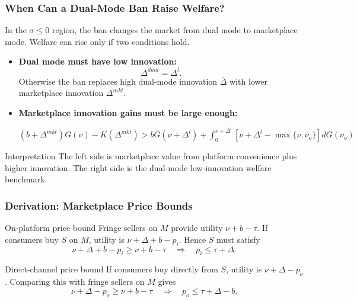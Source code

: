 \begin{frame}
  \frametitle{When Can a Dual-Mode Ban Raise Welfare?}
  \footnotesize
  In the $\sigma\leq0$ region, the ban changes the market from dual mode to
  marketplace mode. Welfare can rise only if two conditions hold.

  \begin{itemize}
    \item \textbf{Dual mode must have low innovation:}
      \[
        \Delta^{dual}=\Delta^l.
      \]
      Otherwise the ban replaces high dual-mode innovation
      $\bar{\Delta}$ with lower marketplace innovation $\Delta^{mkt}$.

    \item \textbf{Marketplace innovation gains must be large enough:}
      \begin{center}
        \hypertarget{ban_welfare_condition_src}{%
          \hyperlink{ban_welfare_condition_deriv}{%
            $\displaystyle
            (b+\Delta^{mkt})G(\nu)-K(\Delta^{mkt})
            >
            bG(\nu+\Delta^l)
            +
            \int_0^{\nu+\Delta^l}
            \left[
              \nu+\Delta^l-\max\{\nu,\nu_o\}
            \right]dG(\nu_o)$}}
      \end{center}
  \end{itemize}

  \begin{alertblock}{Interpretation}
    The left side is marketplace value from platform convenience plus higher
    innovation. The right side is the dual-mode low-innovation welfare
    benchmark.
  \end{alertblock}
\end{frame}

\begin{frame}
  \frametitle{Derivation: Marketplace Price Bounds}
  \hypertarget{mp_price_bounds_deriv}{}
  \footnotesize

  \begin{block}{On-platform price bound}
    Fringe sellers on $M$ provide utility $\nu+b-\tau$. If consumers buy
    $S$ on $M$, utility is $\nu+\Delta+b-p_i$. Hence $S$ must satisfy
    \[
      \nu+\Delta+b-p_i \geq \nu+b-\tau
      \quad\Longrightarrow\quad
      p_i\leq \tau+\Delta.
    \]
  \end{block}

  \begin{block}{Direct-channel price bound}
    If consumers buy directly from $S$, utility is $\nu+\Delta-p_o$.
    Comparing this with fringe sellers on $M$ gives
    \[
      \nu+\Delta-p_o \geq \nu+b-\tau
      \quad\Longrightarrow\quad
      p_o\leq \tau+\Delta-b.
    \]
  \end{block}

  \hyperlink{mp_price_bounds_src}{}
\end{frame}

